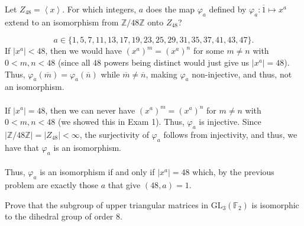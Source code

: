 \documentclass[12 pt, letterpaper]{hmcpset}
\begin{document}
\pagebreak

\begin{problem}
	Let $Z_{48} = \left < x \right >$. For which integers, $a$ does the map $\varphi_{a}$ defined by $\varphi_{a} : \overline{1} \mapsto x^{a}$ extend to an isomorphism from $\mathbb{Z} / 48 \mathbb{Z}$ onto $Z_{48}$?
\end{problem}

\begin{solution}
	\[
		\boxed{
			a \in \{ 1, 5, 7, 11, 13, 17, 19, 23, 25, 29, 31, 35, 37, 41, 43, 47 \}.
		}
	\]
	If $\lvert x^{a} \rvert < 48$, then we would have $(x^{a})^{m} = (x^{a})^{n}$ for some $m \neq n$ with $0 < m, n < 48$ (since all $48$ powers being distinct would just give us $\lvert x^{a} \rvert = 48$). Thus, $\varphi_{a}(\overline{m}) = \varphi_{a}(\overline{n})$ while $\overline{m} \neq \overline{n}$, making $\varphi_{a}$ non-injective, and thus, not an isomorphism. \\\\
	If $\lvert x^{a} \rvert = 48$, then we can never have $(x^{a})^{m} = (x^{a})^{n}$ for $m \neq n$ with $0 < m, n < 48$ (we showed this in Exam 1). Thus, $\varphi_{a}$ is injective. Since $\lvert \mathbb{Z}/48 \mathbb{Z} \rvert = \lvert Z_{48} \rvert < \infty$, the surjectivity of $\varphi_{a}$ follows from injectivity, and thus, we have that $\varphi_{a}$ is an isomorphism. \\\\
	Thus, $\varphi_{a}$ is an isomorphism if and only if $\lvert x^{a} \rvert = 48$ which, by the previous problem are exactly those $a$ that give $(48, a) = 1$.
\end{solution}	

\pagebreak

\begin{problem}
	Prove that the subgroup of upper triangular matrices in $\mathrm{GL}_{3}(\mathbb{F}_{2})$ is isomorphic to the dihedral group of order $8$.
\end{problem}
\end{document}
